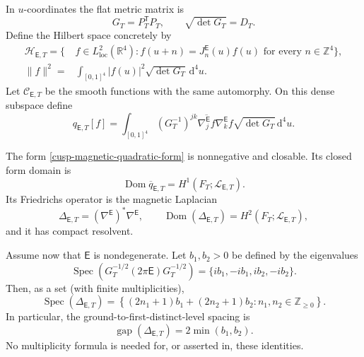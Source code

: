 In \(u\)-coordinates the flat metric matrix is
\begin{equation}
 G_T=P_T^{\mathsf T}P_T,
 \qquad
 \sqrt{\det G_T}=D_T.
 \label{cusp-magnetic-flat-Gram}
\end{equation}
Define the Hilbert space concretely by
\begin{align}
 \mathcal H_{\mathsf E,T}
 =\{\,&f\in L^2_{\mathrm{loc}}(\mathbb R^4):
 f(u+n)=J_n^{\mathsf E}(u)f(u)\text{ for every }n\in\mathbb Z^4\},
 \label{cusp-magnetic-Hilbert-space}\\
 \lVert f\rVert^2
 ={}&\int_{[0,1]^4}\lvert f(u)\rvert^2\sqrt{\det G_T}\,\mathrm d^4u.
 \nonumber
\end{align}
Let \(\mathcal C_{\mathsf E,T}\) be the smooth functions with the same
automorphy.  On this dense subspace define
\begin{equation}
 q_{\mathsf E,T}[f]
 =\int_{[0,1]^4}
  (G_T^{-1})^{jk}
  \overline{\nabla^{\mathsf E}_jf}
  \nabla^{\mathsf E}_kf
  \sqrt{\det G_T}\,\mathrm d^4u.
 \label{cusp-magnetic-quadratic-form}
\end{equation}

\begin{theorem}
\label{cusp-magnetic-oscillator-theorem}
The form \eqref{cusp-magnetic-quadratic-form} is nonnegative and closable.
Its closed form domain is
\[
 \operatorname{Dom}\overline q_{\mathsf E,T}
 =H^1(F_T;\mathscr L_{\mathsf E,T}).
\]
Its Friedrichs operator is the
magnetic Laplacian
\[
 \Delta_{\mathsf E,T}=(\nabla^{\mathsf E})^*\nabla^{\mathsf E},
 \qquad
 \operatorname{Dom}(\Delta_{\mathsf E,T})
 =H^2(F_T;\mathscr L_{\mathsf E,T}),
\]
and it has compact resolvent.

Assume now that \(\mathsf E\) is nondegenerate.  Let \(b_1,b_2>0\) be
defined by the eigenvalues
\begin{equation}
 \operatorname{Spec}\!\left(
  G_T^{-1/2}(2\pi\mathsf E)G_T^{-1/2}\right)
 =\{ib_1,-ib_1,ib_2,-ib_2\}.
 \label{cusp-magnetic-frequency-definition}
\end{equation}
Then, as a set (with finite multiplicities),
\begin{equation}
 \operatorname{Spec}(\Delta_{\mathsf E,T})
 =\left\{(2n_1+1)b_1+(2n_2+1)b_2:
 n_1,n_2\in\mathbb Z_{\ge0}\right\}.
 \label{cusp-magnetic-oscillator-spectrum}
\end{equation}
In particular, the ground-to-first-distinct-level spacing is
\begin{equation}
 \operatorname{gap}(\Delta_{\mathsf E,T})=2\min(b_1,b_2).
 \label{cusp-magnetic-level-gap}
\end{equation}
No multiplicity formula is needed for, or asserted in, these identities.
\end{theorem}

